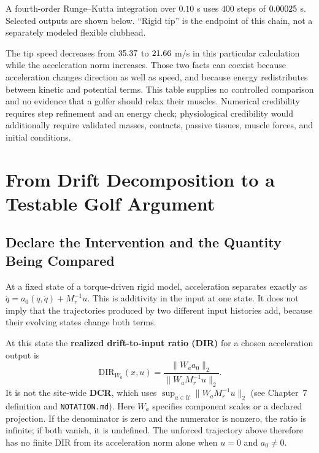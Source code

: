 A fourth-order Runge--Kutta integration over $0.10$ s uses $400$ steps of $0.00025$ s. Selected outputs are shown below. ``Rigid tip'' is the endpoint of this chain, not a separately modeled flexible clubhead.

\begin{center}
\small
\cheightZtcfTable
\end{center}

The tip speed decreases from $35.37$ to $21.66$ m/s in this particular calculation while the acceleration norm increases. Those two facts can coexist because acceleration changes direction as well as speed, and because energy redistributes between kinetic and potential terms. This table supplies no controlled comparison and no evidence that a golfer should relax their muscles. Numerical credibility requires step refinement and an energy check; physiological credibility would additionally require validated masses, contacts, passive tissues, muscle forces, and initial conditions.

\section{From Drift Decomposition to a Testable Golf Argument}

\subsection{Declare the Intervention and the Quantity Being Compared}

At a fixed state of a torque-driven rigid model, acceleration separates exactly as $\ddot q=a_0(q,\dot q)+M_r^{-1}u$. This is additivity in the input at one state. It does not imply that the trajectories produced by two different input histories add, because their evolving states change both terms.

At this state the \textbf{realized drift-to-input ratio (DIR)} for a chosen acceleration output is
\begin{equation}
 \mathrm{DIR}_{W_a}(x,u)=\frac{\|W_a a_0\|_2}{\|W_a M_r^{-1}u\|_2}.
\end{equation}
It is not the site-wide \textbf{DCR}, which uses $\sup_{u\in\mathcal U}\|W_a M_r^{-1}u\|_2$ (see Chapter~7 definition and \texttt{NOTATION.md}). Here $W_a$ specifies component scales or a declared projection. If the denominator is zero and the numerator is nonzero, the ratio is infinite; if both vanish, it is undefined. The unforced trajectory above therefore has no finite DIR from its acceleration norm alone when $u=0$ and $a_0\neq 0$.


